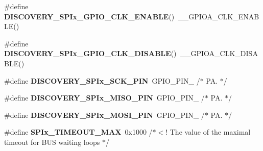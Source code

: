 \begin{DoxyCompactItemize}
\#define {\bfseries D\+I\+S\+C\+O\+V\+E\+R\+Y\+\_\+\+S\+P\+Ix\+\_\+\+G\+P\+I\+O\+\_\+\+C\+L\+K\+\_\+\+E\+N\+A\+B\+LE}()~\+\_\+\+\_\+\+G\+P\+I\+O\+A\+\_\+\+C\+L\+K\+\_\+\+E\+N\+A\+B\+LE()
\item 
\mbox{\label{group___s_t_m32_f4___d_i_s_c_o_v_e_r_y___l_o_w___l_e_v_e_l___b_u_s_ga9b7b687532933dcfded82e31d82031bd}} 
\#define {\bfseries D\+I\+S\+C\+O\+V\+E\+R\+Y\+\_\+\+S\+P\+Ix\+\_\+\+G\+P\+I\+O\+\_\+\+C\+L\+K\+\_\+\+D\+I\+S\+A\+B\+LE}()~\+\_\+\+\_\+\+G\+P\+I\+O\+A\+\_\+\+C\+L\+K\+\_\+\+D\+I\+S\+A\+B\+LE()
\item 
\mbox{\label{group___s_t_m32_f4___d_i_s_c_o_v_e_r_y___l_o_w___l_e_v_e_l___b_u_s_gac77ab86b7f08988d95259cd472656b5a}} 
\#define {\bfseries D\+I\+S\+C\+O\+V\+E\+R\+Y\+\_\+\+S\+P\+Ix\+\_\+\+S\+C\+K\+\_\+\+P\+IN}~G\+P\+I\+O\+\_\+\+P\+I\+N\+\_                 /$\ast$ P\+A. $\ast$/
\item 
\mbox{\label{group___s_t_m32_f4___d_i_s_c_o_v_e_r_y___l_o_w___l_e_v_e_l___b_u_s_ga4985aa193ed1820dcfc5e04bf62d51a5}} 
\#define {\bfseries D\+I\+S\+C\+O\+V\+E\+R\+Y\+\_\+\+S\+P\+Ix\+\_\+\+M\+I\+S\+O\+\_\+\+P\+IN}~G\+P\+I\+O\+\_\+\+P\+I\+N\+\_                 /$\ast$ P\+A. $\ast$/
\item 
\mbox{\label{group___s_t_m32_f4___d_i_s_c_o_v_e_r_y___l_o_w___l_e_v_e_l___b_u_s_ga513aef6a350898c3a961b5e209223c51}} 
\#define {\bfseries D\+I\+S\+C\+O\+V\+E\+R\+Y\+\_\+\+S\+P\+Ix\+\_\+\+M\+O\+S\+I\+\_\+\+P\+IN}~G\+P\+I\+O\+\_\+\+P\+I\+N\+\_                 /$\ast$ P\+A. $\ast$/
\item 
\mbox{\label{group___s_t_m32_f4___d_i_s_c_o_v_e_r_y___l_o_w___l_e_v_e_l___b_u_s_ga0268d538ae7a739940a81bd492f6040b}} 
\#define {\bfseries S\+P\+Ix\+\_\+\+T\+I\+M\+E\+O\+U\+T\+\_\+\+M\+AX}~0x1000 /$\ast$$<$! The value of the maximal timeout for B\+U\+S waiting loops $\ast$/
\item 
\mbox{\label{group___s_t_m32_f4___d_i_s_c_o_v_e_r_y___l_o_w___l_e_v_e_l___b_u_s_ga5a5a965c59e8c81cfc6abafbd57327e7}} 
$$
\end{DoxyCompactItemize}
